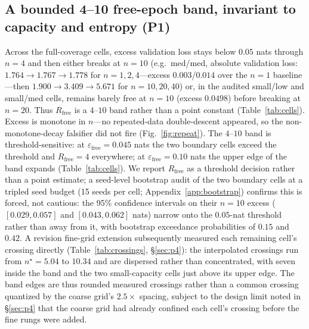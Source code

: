 \documentclass[11pt]{article}
\begin{document}
\subsection{A bounded 4--10 free-epoch band, invariant to capacity and entropy (P1)}\label{sec:p1}

Across the full-coverage cells, excess validation loss stays below $0.05$ nats through
$n = 4$ and then either breaks at $n = 10$ (e.g.\ med/med, absolute validation loss:
$1.764 \to 1.767 \to 1.778$ for $n = 1,2,4$---excess $0.003$/$0.014$ over the $n{=}1$
baseline---then $1.900 \to 3.409 \to 5.671$ for $n = 10,20,40$) or, in the audited
small/low and small/med cells, remains barely free at $n=10$ (excess $0.0498$) before
breaking at $n=20$. Thus $R_{\mathrm{free}}$ is a $4$--$10$ band rather than a point
constant (Table~\ref{tab:cells}). Excess is monotone in $n$---no repeated-data double-descent
\citep{hernandez2022repeateddata} appeared, so the non-monotone-decay falsifier did not
fire (Fig.~\ref{fig:repeat}).
The $4$--$10$ band is threshold-sensitive: at $\varepsilon_{\mathrm{free}}{=}0.045$ nats
the two boundary cells exceed the threshold and $R_{\mathrm{free}}=4$ everywhere; at
$\varepsilon_{\mathrm{free}}{=}0.10$ nats the upper edge of the band expands
(Table~\ref{tab:cells}). We report $R_{\mathrm{free}}$ as a threshold decision rather
than a point estimate; a seed-level bootstrap audit of the two boundary cells at a
tripled seed budget (15 seeds per cell; Appendix~\ref{app:bootstrap}) confirms this is
forced, not cautious: the 95\% confidence intervals on their $n{=}10$ excess
($[0.029,0.057]$ and $[0.043,0.062]$ nats) narrow onto the $0.05$-nat threshold rather
than away from it, with bootstrap exceedance probabilities of $0.15$ and $0.42$.
A revision fine-grid extension subsequently measured each remaining cell's crossing
directly (Table~\ref{tab:crossings}, \S\ref{sec:p4}): the interpolated crossings run
from $n^\star = 5.04$ to $10.34$ and are dispersed rather than concentrated, with
seven inside the band and the two small-capacity cells just above its upper edge.
The band edges are thus rounded measured crossings rather than a common crossing
quantized by the coarse grid's $2.5\times$ spacing, subject to the design limit
noted in \S\ref{sec:p4} that the coarse grid had already confined each cell's
crossing before the fine rungs were added.
\end{document}

